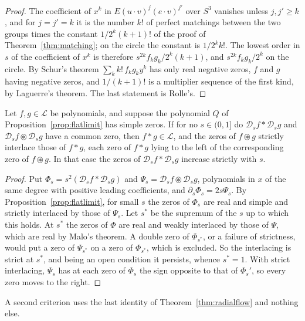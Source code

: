 \begin{proof}
The coefficient of $x^k$ in $E(u\cdot v)^j(e\cdot v)^{j'}$ over $S^3$ vanishes unless $j,j'\ge k$, and for $j=j'=k$ it is the number $k!$ of perfect matchings between the two groups times the constant $1/2^k(k+1)!$ of the proof of Theorem~\ref{thm:matching}; on the circle the constant is $1/2^kk!$. The lowest order in $s$ of the coefficient of $x^k$ is therefore $s^{2k}f_kg_k/2^k(k+1)$, and $s^{2k}f_kg_k/2^k$ on the circle. By Schur's theorem $\sum_kk!\,f_kg_ky^k$ has only real negative zeros, $f$ and $g$ having negative zeros, and $1/(k+1)!$ is a multiplier sequence of the first kind, by Laguerre's theorem. The last statement is Rolle's.
\end{proof}

\begin{theorem}\label{thm:flowclosure}
Let $f,g\in\mathcal L$ be polynomials, and suppose the polynomial $Q$ of Proposition~\ref{prop:flatlimit} has simple zeros. If for no $s\in(0,1]$ do $\mathcal D_sf*\mathcal D_sg$ and $\mathcal D_sf\circledast \mathcal D_sg$ have a common zero, then $f*g\in\mathcal L$, and the zeros of $f\circledast g$ strictly interlace those of $f*g$, each zero of $f*g$ lying to the left of the corresponding zero of $f\circledast g$. In that case the zeros of $\mathcal D_sf*\mathcal D_sg$ increase strictly with $s$.
\end{theorem}

\begin{proof}
Put $\Phi_s=s^2(\mathcal D_sf*\mathcal D_sg)$ and $\Psi_s=\mathcal D_sf\circledast \mathcal D_sg$, polynomials in $x$ of the same degree with positive leading coefficients, and $\partial_s\Phi_s=2s\Psi_s$. By Proposition~\ref{prop:flatlimit}, for small $s$ the zeros of $\Phi_s$ are real and simple and strictly interlaced by those of $\Psi_s$. Let $s^*$ be the supremum of the $s$ up to which this holds. At $s^*$ the zeros of $\Phi$ are real and weakly interlaced by those of $\Psi$, which are real by Malo's theorem. A double zero of $\Phi_{s^*}$, or a failure of strictness, would put a zero of $\Psi_{s^*}$ on a zero of $\Phi_{s^*}$, which is excluded. So the interlacing is strict at $s^*$, and being an open condition it persists, whence $s^*=1$. With strict interlacing, $\Psi_s$ has at each zero of $\Phi_s$ the sign opposite to that of $\Phi_s'$, so every zero moves to the right.
\end{proof}

A second criterion uses the last identity of Theorem~\ref{thm:radialflow} and nothing else.

